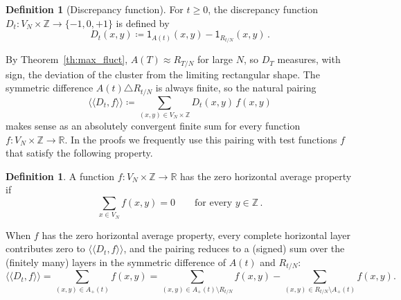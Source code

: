\documentclass[11pt,a4paper,reqno]{amsart}
\theoremstyle{definition}
\newtheorem{Definition}[Theorem]{Definition}
\newcommand{\bbR}{{\ensuremath{\mathbb R}} }
\newcommand{\bbZ}{{\ensuremath{\mathbb Z}} }
\newcommand{\laa}{\langle \! \langle}
\newcommand{\raa}{\rangle \! \rangle}
\begin{document}
\begin{Definition}[Discrepancy function]
For $t \geq 0$, the discrepancy function $D_t : V_N \times \bbZ \to \{-1, 0, +1\}$ is defined by
	\[ D_t(x, y) \coloneqq \mathsf{1}_{A(t)}(x, y) - \mathsf{1}_{R_{t/N}}(x, y)\,. \]
\end{Definition}
By Theorem~\ref{th:max_fluct}, $A(T) \approx R_{T/N}$ for large $N$, so $D_T$ measures, with sign, the deviation of the cluster from the limiting rectangular shape. The symmetric difference $A(t)\triangle R_{t/N}$ is always finite, so the natural pairing
	\[ \laa D_t, f \raa \coloneqq \sum_{(x,y) \in V_N \times \bbZ} D_t(x, y)\, f(x, y) \]
makes sense as an absolutely convergent finite sum for every function $f : V_N \times \bbZ \to \bbR$. In the proofs we frequently use this pairing with test functions $f$ that satisfy the following property.

\begin{Definition}\label{def:zero}
A function $f : V_N \times \bbZ \to \bbR$ has the zero horizontal average property if
	\begin{equation}\label{eq:zero_average}
	\sum_{x \in V_N} f(x, y) = 0 \qquad \text{for every } y \in \bbZ\,.
	\end{equation}
\end{Definition}

When $f$ has the zero horizontal average property, every complete horizontal layer contributes zero to $\laa D_t, f\raa$, and the pairing reduces to a (signed) sum over the (finitely many) layers in the symmetric difference of $A(t)$ and $R_{t/N}$:
	\[ \laa D_t, f\raa = \sum_{(x,y) \in A_+(t)} f(x,y) 
= \sum_{(x,y) \in A_+(t) \setminus R_{t/N} } f(x,y) - \sum_{(x,y) \in R_{t/N} \setminus A_+(t)} f(x,y) 
	. \]
\end{document}
